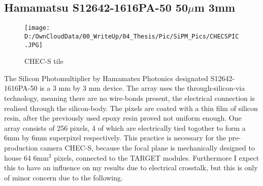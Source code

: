 \documentclass[12pt,article,type=msc,colorback,accentcolor=tud9c]{tudthesis}
\begin{document}
\clearpage
\subsection{Hamamatsu S12642-1616PA-50 50$\mu$m 3mm}
\begin{wrapfigure}{R}{0.3\textwidth}
\centering
\texttt{[image: D:/OwnCloudData/00\_WriteUp/04\_Thesis/Pic/SiPM\_Pics/CHECSPIC.JPG]}
\caption{\label{fig:CHECSTILE}CHEC-S tile}
\end{wrapfigure}
The Silicon Photomultiplier by Hamamatsu Photonics designated S12642-1616PA-50 is a 3 mm by 3 mm device. The array uses the through-silicon-via technology, meaning there are no wire-bonds present, the electrical connection is realised through the silicon-body. The pixels are coated with a thin film of silicon resin, after the previously used epoxy resin proved not uniform enough. One array consists of 256 pixels, 4 of which are electrically tied togother to form a 6mm by 6mm superpixel respectively. This practice is necessary for the pre-production camera CHEC-S, because the focal plane is mechanically designed to house 64 6mm$^{2}$ pixels, connected to the TARGET modules. Furthermore I expect this to have an influence on my results due to electrical crosstalk, but this is only of minor concern due to the following. 
\end{document}
